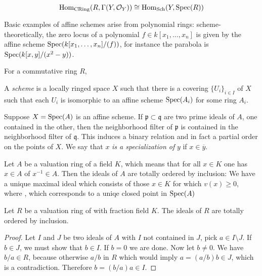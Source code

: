 \[
	\operatorname{Hom}_{\text{CRing}}(R, \Gamma(Y,\mathcal{O}_Y)) \cong \operatorname{Hom}_{\text{Sch}}(Y, \operatorname{Spec}(R))
\]

Basic examples of affine schemes arise from polynomial rings: scheme-theoretically, the zero locus of a polynomial $f \in k[x_1, \dots, x_n]$ is given by the affine scheme $\operatorname{Spec}(k[x_1, \dots, x_n]/(f))$, for instance the parabola is $\operatorname{Spec}(k[x,y]/(x^2-y))$.

\begin{proposition}
	For a commutative ring $R$,
\end{proposition}

\begin{definition}
	A \textit{scheme} is a locally ringed space $X$ such that there is a covering $\{U_i\}_{i \in I}$ of $X$ such that each $U_i$ is isomorphic to an affine scheme $\operatorname{Spec}(A_i)$ for some ring $A_i$.
\end{definition}

Suppose $X = \operatorname{Spec}(A)$ is an affine scheme. If $\mathfrak{p} \subset \mathfrak{q}$ are two prime ideals of $A$, one contained in the other, then the neighborhood filter of $\mathfrak{p}$ is contained in the neighborhood filter of $\mathfrak{q}$. This induces a binary relation and in fact a partial order on the points of $X$. We say that $x$ \textit{is a specialization of} $y$ if $x \in \overline{y}$.

\begin{example}
	Let $A$ be a valuation ring of a field $K$, which means that for all $x \in K$ one has $x \in A$ of $x^{-1} \in A$. Then the ideals of $A$ are totally ordered by inclusion: We have a unique maximal ideal which consists of those $x \in K$ for which $v(x) \ge 0$, where , which corresponds to a uniqe closed point in $\operatorname{Spec}(A)$

	\begin{lemma}
		Let $R$ be a valuation ring of with fraction field $K$. The ideals of $R$ are totally ordered by inclusion.
	\end{lemma}

	\begin{proof}
		Let $I$ and $J$ be two ideals of $A$ with $I$ not contained in $J$, pick $a \in I \setminus J$. If $b \in J$, we must show that $b \in I$. If $b = 0$ we are done. Now let $b \neq 0$. We have $b/a \in R$, because otherwise $a/b$ in $R$ which would imply $a = (a/b)b \in J$, which is a contradiction. Therefore $b = (b/a)a \in I$.
	\end{proof}
\end{example}

